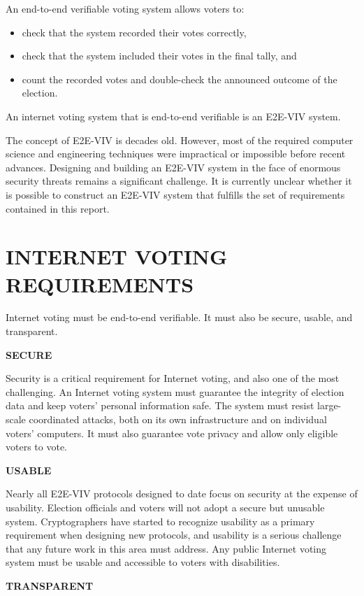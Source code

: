 An end-to-end verifiable voting system allows voters to:
\begin{itemize}
\item check that the system recorded their votes correctly,
\item check that the system included their votes in the final tally,
  and
\item count the recorded votes and double-check the announced outcome
  of the election.
\end{itemize}

An internet voting system that is end-to-end verifiable is an E2E-VIV
system.

The concept of E2E-VIV is decades old. However, most of the required
computer science and engineering techniques were impractical or
impossible before recent advances. Designing and building an E2E-VIV
system in the face of enormous security threats remains a significant
challenge. It is currently unclear whether it is possible to construct
an E2E-VIV system that fulfills the set of requirements contained in
this report.

\section*{INTERNET VOTING REQUIREMENTS}

Internet voting must be end-to-end verifiable. It must also be secure,
usable, and transparent.

\noindent \textbf{SECURE}

Security is a critical requirement for Internet voting, and also one
of the most challenging. An Internet voting system must guarantee the
integrity of election data and keep voters’ personal information
safe. The system must resist large-scale coordinated attacks, both on
its own infrastructure and on individual voters’ computers. It must
also guarantee vote privacy and allow only eligible voters to vote.

\noindent \textbf{USABLE}

Nearly all E2E-VIV protocols designed to date focus on security at the
expense of usability. Election officials and voters will not adopt a
secure but unusable system. Cryptographers have started to recognize
usability as a primary requirement when designing new protocols, and
usability is a serious challenge that any future work in this area
must address. Any public Internet voting system must be usable and
accessible to voters with disabilities.

\noindent \textbf{TRANSPARENT}

